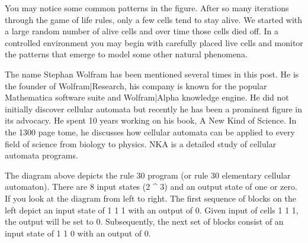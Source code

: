 You may notice some common patterns in the figure. After so many iterations
through the game of life rules, only a few cells tend to stay alive. We started
with a large random number of alive cells and over time those cells died off. In
a controlled environment you may begin with carefully placed live cells and
monitor the patterns that emerge to model some other natural phenomena.

The name Stephan Wolfram has been mentioned several times in this post. He is
the founder of Wolfram|Research, his company is known for the popular
Mathematica software suite and Wolfram|Alpha knowledge engine. He did not
initially discover cellular automata but recently he has been a prominent figure
in its advocacy. He spent 10 years working on his book, A New Kind of Science.
In the 1300 page tome, he discusses how cellular automata can be applied to
every field of science from biology to physics. NKA is a detailed study of
cellular automata programs.

The diagram above depicts the rule 30 program (or rule 30 elementary cellular
automaton). There are 8 input states (2 ^ 3) and an output state of one or zero.
If you look at the diagram from left to right. The first sequence of blocks on
the left depict an input state of { 1 1 1 } with an output of 0. Given input of
cells { 1 1 1}, the output will be set to 0. Subsequently, the next set of
blocks consist of an input state of { 1 1 0 } with an output of 0.
